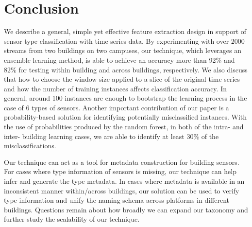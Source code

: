 \section{Conclusion}
We describe a general, simple yet effective feature extraction design in support of sensor type classification with time series data. By experimenting 
with over 2000 streams from two buildings on two campuses, our technique, which leverages an ensemble learning method, is able to achieve an accuracy more than 
92\% and 82\% for testing within building and across buildings, respectively. We also discuss that how to choose the window size applied 
to a slice of the original time series and how the number of training instances affects classification accuracy. In general, around 100 instances are
enough to bootstrap the learning process in the case of 6 types of sensors. Another important contribution of our paper is a probability-based solution for identifying 
potentially misclassified instances. With the use of probabilities produced by the random forest, in both of the intra- and inter- building learning cases, we are able 
to identify at least 30\% of the misclassifications.%

Our technique can act as a tool for metadata construction for building sensors. For cases where type information of sensors is missing, our technique can 
help infer and generate the type metadata. In cases where metadata is available in an inconsistent manner within/across buildings, our solution 
can be used to verify type information and unify the naming schema across platforms in different buildings. Questions remain about how broadly we 
can expand our taxonomy and further study the scalability of our technique.

